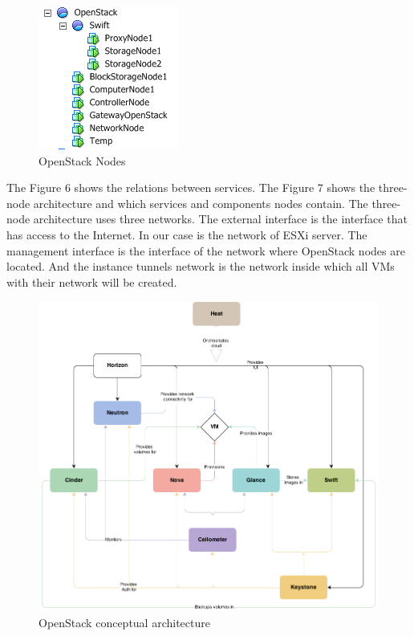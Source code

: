 \begin{figure}[ht!]
\centering
\includegraphics{openstack_tree.png}
\caption{OpenStack Nodes}
\label{overflow}
\end{figure}

The Figure 6 shows the relations between services. The Figure 7 shows the three-node architecture and which services and components nodes contain. The three-node  architecture uses three networks. The external interface is the interface that has access to the Internet. In our case is the network of ESXi server. The management interface is the interface of the network where OpenStack nodes are located. And the instance tunnels network is the network inside which all VMs with their network will be created. 




\begin{figure}[ht!]
\centering
\includegraphics[width=\textwidth]{openstack_conceptual_architecture.png}
\caption{OpenStack conceptual architecture}
\label{overflow}
\end{figure}


